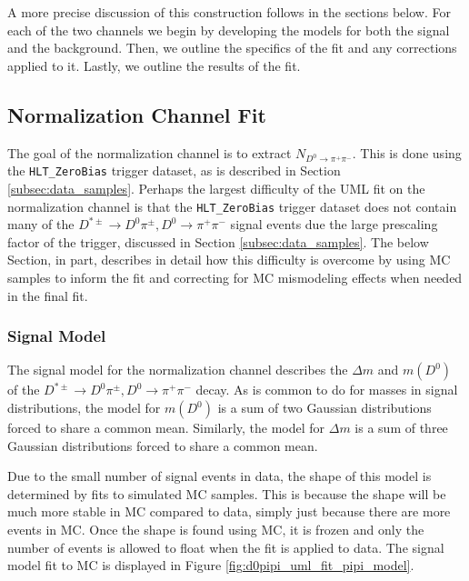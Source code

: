 A more precise discussion of this construction follows in the sections below. For each of the two channels we begin by developing the models for both the signal and the background. Then, we outline the specifics of the fit and any corrections applied to it. Lastly, we outline the results of the fit. 

\subsection{Normalization Channel Fit}
\label{subsec:normalization_channel_fit}

The goal of the normalization channel is to extract $N_{D^0 \to \pi^+ \pi^-}$. This is done using the \texttt{HLT\_ZeroBias} trigger dataset, as is described in Section \ref{subsec:data_samples}. Perhaps the largest difficulty of the UML fit on the normalization channel is that the \texttt{HLT\_ZeroBias} trigger dataset does not contain many of the $D^{*\pm}\to D^0 \pi^\pm, D^0 \to \pi^+ \pi^-$ signal events due the large prescaling factor of the trigger, discussed in Section \ref{subsec:data_samples}. The below Section, in part, describes in detail how this difficulty is overcome by using MC samples to inform the fit and correcting for MC mismodeling effects when needed in the final fit. 

\subsubsection{Signal Model}

The signal model for the normalization channel describes the $\Delta m$ and $m(D^0)$ of the $D^{*\pm}\to D^0 \pi^\pm, D^0 \to \pi^+ \pi^-$ decay. As is common to do for masses in signal distributions, the model for $m(D^0)$ is a sum of two Gaussian distributions forced to share a common mean. Similarly, the model for $\Delta m$ is a sum of three Gaussian distributions forced to share a common mean.

Due to the small number of signal events in data, the shape of this model is determined by fits to simulated MC samples. This is because the shape will be much more stable in MC compared to data, simply just because there are more events in MC. Once the shape is found using MC, it is frozen and only the number of events is allowed to float when the fit is applied to data. The signal model fit to MC is displayed in Figure \ref{fig:d0pipi_uml_fit_pipi_model}.

